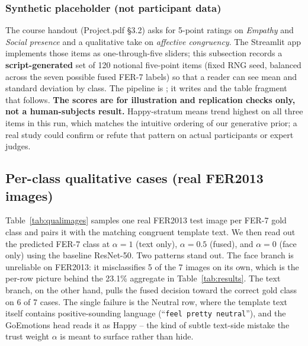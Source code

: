 \documentclass[sigconf,nonacm]{acmart}
\begin{document}
  \subsubsection*{Synthetic placeholder (not participant data)}
  The course handout (Project.pdf \S3.2) asks for 5-point ratings on \emph{Empathy} and \emph{Social presence} and a qualitative take on \emph{affective congruency}. The Streamlit app implements those items as one-through-five sliders; this subsection records a \textbf{script-generated} set of 120 notional five-point items (fixed RNG seed, balanced across the seven possible fused FER-7 labels) so that a reader can see mean and standard deviation by class. The pipeline is ; it writes  and the table fragment that follows. \textbf{The scores are for illustration and replication checks only, not a human-subjects result.} Happy-stratum means trend highest on all three items in this run, which matches the intuitive ordering of our generative prior; a real study could confirm or refute that pattern on actual participants or expert judges.

  

  \subsection{Per-class qualitative cases (real FER2013 images)}
  Table~\ref{tab:qualimages} samples one real FER2013 test image per FER-7 gold class and pairs it with the matching congruent template text. We then read out the predicted FER-7 class at $\alpha\!=\!1$ (text only), $\alpha\!=\!0.5$ (fused), and $\alpha\!=\!0$ (face only) using the baseline ResNet-50. Two patterns stand out. The face branch is unreliable on FER2013: it misclassifies 5 of the 7 images on its own, which is the per-row picture behind the 23.1\% aggregate in Table~\ref{tab:results}. The text branch, on the other hand, pulls the fused decision toward the correct gold class on 6 of 7 cases. The single failure is the Neutral row, where the template text itself contains positive-sounding language (``\texttt{feel pretty neutral}''), and the GoEmotions head reads it as Happy -- the kind of subtle text-side mistake the trust weight $\alpha$ is meant to surface rather than hide.
\end{document}
